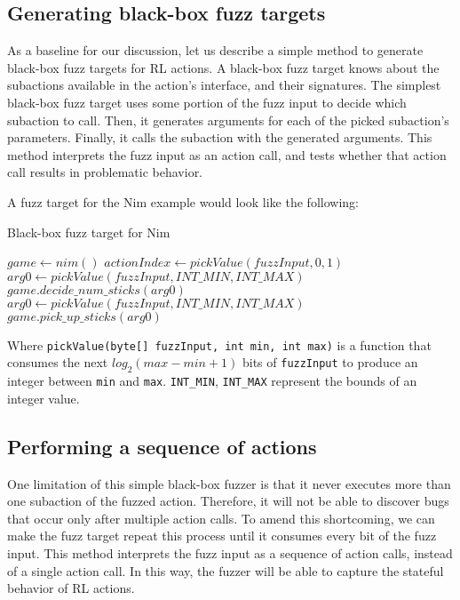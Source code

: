\subsection{Generating black-box fuzz targets} \label{blackboxFuzzTargets}
As a baseline for our discussion, let us describe a simple method to generate black-box fuzz targets for RL actions.
A black-box fuzz target knows about the subactions available in the action's interface, and their signatures.
The simplest black-box fuzz target uses some portion of the fuzz input to decide which subaction to call.
Then, it generates arguments for each of the picked subaction's parameters.
Finally, it calls the subaction with the generated arguments.
This method interprets the fuzz input as an action call, and tests whether that action call results in problematic behavior.

A fuzz target for the Nim example would look like the following:
\begin{algorithm}[H]
    \caption{Black-box fuzz target for Nim}
    \begin{algorithmic}[1]
    \STATE $game \gets nim()$
    \STATE $actionIndex \gets pickValue(fuzzInput, 0, 1)$
        \STATE $arg0 \gets pickValue(fuzzInput, INT\_MIN, INT\_MAX)$
        \STATE $game.decide\_num\_sticks(arg0)$
    \ENDIF
        \STATE $arg0 \gets pickValue(fuzzInput, INT\_MIN, INT\_MAX)$
        \STATE $game.pick\_up\_sticks(arg0)$
    \ENDIF
    \end{algorithmic}
\end{algorithm}
Where \texttt{pickValue(byte[] fuzzInput, int min, int max)} is a function that consumes the next $log_2(max - min + 1)$ bits of \texttt{fuzzInput}
 to produce an integer between \texttt{min} and \texttt{max}.
 \texttt{INT\_MIN}, \texttt{INT\_MAX} represent the bounds of an integer value.

\subsection{Performing a sequence of actions}
One limitation of this simple black-box fuzzer is that it never executes more than one subaction of the fuzzed action.
Therefore, it will not be able to discover bugs that occur only after multiple action calls.
To amend this shortcoming, we can make the fuzz target repeat this process until it consumes every bit of the fuzz input.
This method interprets the fuzz input as a sequence of action calls, instead of a single action call.
In this way, the fuzzer will be able to capture the stateful behavior of RL actions.


